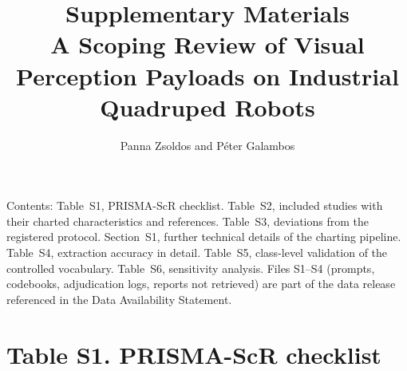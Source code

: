 \documentclass[10pt]{article}
\title{Supplementary Materials\\[2pt]\large A Scoping Review of Visual
Perception Payloads on Industrial Quadruped Robots}
\author{Panna Zsoldos and Péter Galambos}
\date{}
\begin{document}
\maketitle

\noindent Contents: Table~S1, PRISMA-ScR checklist. Table~S2, included
studies with their charted characteristics and references. Table~S3,
deviations from the registered protocol. Section~S1, further technical
details of the charting pipeline. Table~S4, extraction accuracy in detail.
Table~S5, class-level validation of the controlled vocabulary. Table~S6,
sensitivity analysis. Files S1--S4 (prompts, codebooks, adjudication logs,
reports not retrieved) are part of the data release referenced in the Data
Availability Statement.

\section*{Table S1. PRISMA-ScR checklist}
\end{document}
